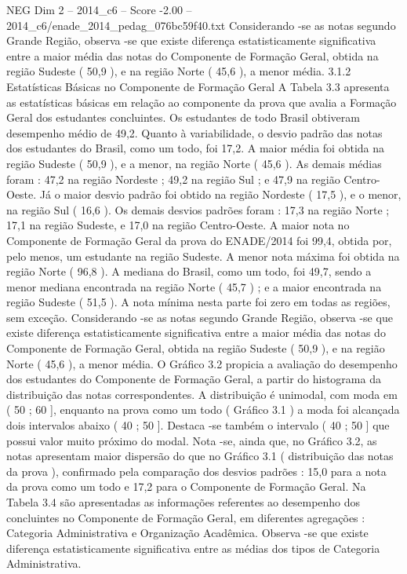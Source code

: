 \begin{textsample}{NEG Dim 2 – 2014\_c6 – Score -2.00 – 2014\_c6/enade\_2014\_pedag\_076bc59f40.txt}
Considerando -se as notas segundo Grande Região, observa -se que existe diferença estatisticamente significativa entre a maior média das notas do Componente de Formação Geral, obtida na região Sudeste ( 50,9 ), e na região Norte ( 45,6 ), a menor média. 3.1.2 Estatísticas Básicas no Componente de Formação Geral A Tabela 3.3 apresenta as estatísticas básicas em relação ao componente da prova que avalia a Formação Geral dos estudantes concluintes.
Os estudantes de todo Brasil obtiveram desempenho médio de 49,2.
Quanto à variabilidade, o desvio padrão das notas dos estudantes do Brasil, como um todo, foi 17,2.
A maior média foi obtida na região Sudeste ( 50,9 ), e a menor, na região Norte ( 45,6 ).
As demais médias foram : 47,2 na região Nordeste ; 49,2 na região Sul ; e 47,9 na região Centro-Oeste.
Já o maior desvio padrão foi obtido na região Nordeste ( 17,5 ), e o menor, na região Sul ( 16,6 ).
Os demais desvios padrões foram : 17,3 na região Norte ; 17,1 na região Sudeste, e 17,0 na região Centro-Oeste.
A maior nota no Componente de Formação Geral da prova do ENADE/2014 foi 99,4, obtida por, pelo menos, um estudante na região Sudeste.
A menor nota máxima foi obtida na região Norte ( 96,8 ).
A mediana do Brasil, como um todo, foi 49,7, sendo a menor mediana encontrada na região Norte ( 45,7 ) ; e a maior encontrada na região Sudeste ( 51,5 ).
A nota mínima nesta parte foi zero em todas as regiões, sem exceção.
Considerando -se as notas segundo Grande Região, observa -se que existe diferença estatisticamente significativa entre a maior média das notas do Componente de Formação Geral, obtida na região Sudeste ( 50,9 ), e na região Norte ( 45,6 ), a menor média.
O Gráfico 3.2 propicia a avaliação do desempenho dos estudantes do Componente de Formação Geral, a partir do histograma da distribuição das notas correspondentes.
A distribuição é unimodal, com moda em ( 50 ; 60 ], enquanto na prova como um todo ( Gráfico 3.1 ) a moda foi alcançada dois intervalos abaixo ( 40 ; 50 ].
Destaca -se também o intervalo ( 40 ; 50 ] que possui valor muito próximo do modal.
Nota -se, ainda que, no Gráfico 3.2, as notas apresentam maior dispersão do que no Gráfico 3.1 ( distribuição das notas da prova ), confirmado pela comparação dos desvios padrões : 15,0 para a nota da prova como um todo e 17,2 para o Componente de Formação Geral.
Na Tabela 3.4 são apresentadas as informações referentes ao desempenho dos concluintes no Componente de Formação Geral, em diferentes agregações : Categoria Administrativa e Organização Acadêmica.
Observa -se que existe diferença estatisticamente significativa entre as médias dos tipos de Categoria Administrativa.

\end{textsample}
